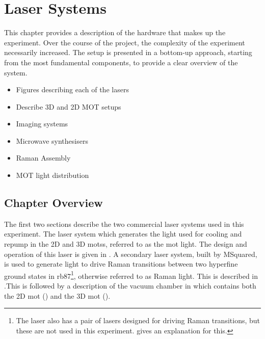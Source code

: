 \chapter{Laser Systems}\label{chap:setup}
This chapter provides a description of the hardware that makes up the experiment. Over the course of the project, the complexity of the experiment necessarily increased. The setup is presented in a bottom-up approach, starting from the most fundamental components, to provide a clear overview of the system. \\

\begin{itemize}\item Figures describing each of the lasers
    \item Describe 3D and 2D MOT setups  
    \item Imaging systems
    \item Microwave synthesisers
    \item Raman Assembly
    \item MOT light distribution
\end{itemize}
\section{Chapter Overview}\label{sec:setup_overview}
The first two sections describe the two commercial laser systems used in this experiment. The \Muquans laser system which generates the light used for cooling and repump in the 2D and 3D \acp{mots}, referred to as the \acs{mot} light. The design and operation of this laser is given in . A secondary laser system, built by MSquared, is used to generate light to drive Raman transitions between two hyperfine ground states in \ac{rb87}\footnote{The \Muquans laser also has a pair of lasers designed for driving Raman transitions, but these are not used in this experiment.  gives an explanation for this.}, otherwise referred to as Raman light. This is described in .This is followed by a description of the vacuum chamber in  which contains both the 2D \ac{mot} () and the 3D \ac{mot} ().  

